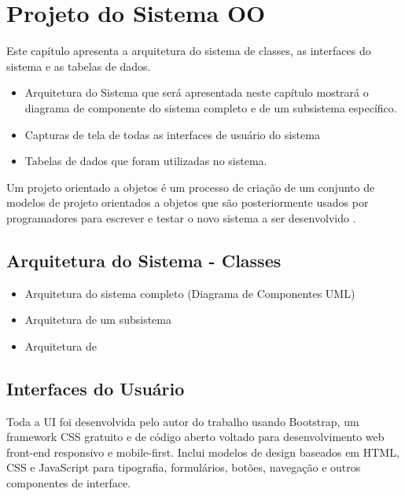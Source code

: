 
\chapter{Projeto do Sistema OO}
Este capítulo apresenta a arquitetura do sistema de classes, as interfaces do sistema e as tabelas de dados.

\begin{itemize}


  \item Arquitetura do Sistema que será apresentada neste capítulo mostrará o diagrama de
        componente do sistema completo e de um subsistema específico.
  \item Capturas de tela de todas as interfaces de usuário do sistema
  \item Tabelas de dados que foram utilizadas no sistema.

\end{itemize}

Um projeto orientado a objetos é um processo de criação de um conjunto de modelos de projeto orientados a objetos que são posteriormente usados por programadores para escrever e testar o novo sistema a ser desenvolvido \cite{Satzinger2012}.

\section{Arquitetura do Sistema - Classes}
\begin{itemize}
  \item Arquitetura do sistema completo (Diagrama de Componentes UML)
  \item Arquitetura de um subsistema
  \item Arquitetura de
\end{itemize}



\section{Interfaces do Usu\'{a}rio}
Toda a UI foi desenvolvida pelo autor do trabalho usando Bootstrap, um framework CSS gratuito e de código aberto voltado para desenvolvimento web front-end responsivo e mobile-first. Inclui modelos de design baseados em HTML, CSS e JavaScript para tipografia, formulários, botões, navegação e outros componentes de interface.

